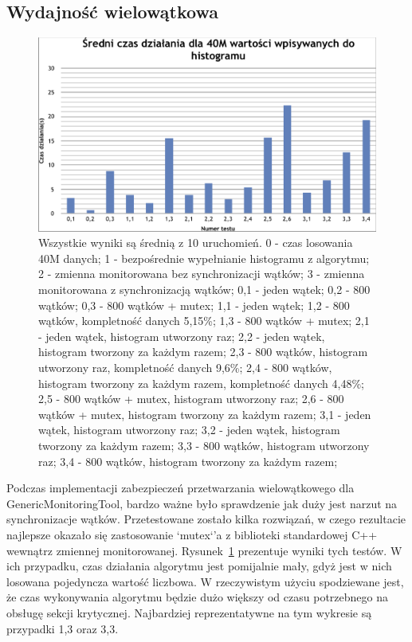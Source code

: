 \subsection{Wydajność wielowątkowa}

\begin{figure}[!ht]
\centering
\includegraphics[width=1\textwidth]{img/avg_run_time.png}
\caption{
Wszystkie wyniki są średnią z 10 uruchomień.
0 - czas losowania 40M danych; 
1 - bezpośrednie wypełnianie histogramu z algorytmu;
2 - zmienna monitorowana bez synchronizacji wątków;
3 - zmienna monitorowana z synchronizacją wątków;
0,1 - jeden wątek;
0,2 - 800 wątków;
0,3 - 800 wątków + mutex;
1,1 - jeden wątek;
1,2 - 800 wątków, kompletność danych 5,15\%;
1,3 - 800 wątków + mutex;
2,1 - jeden wątek, histogram utworzony raz;
2,2 - jeden wątek, histogram tworzony za każdym razem;
2,3 - 800 wątków, histogram utworzony raz, kompletność danych 9,6\%;
2,4 - 800 wątków, histogram tworzony za każdym razem, kompletność danych 4,48\%;
2,5 - 800 wątków + mutex, histogram utworzony raz;
2,6 - 800 wątków + mutex, histogram tworzony za każdym razem;
3,1 - jeden wątek, histogram utworzony raz;
3,2 - jeden wątek, histogram tworzony za każdym razem;
3,3 - 800 wątków, histogram utworzony raz;
3,4 - 800 wątków, histogram tworzony za każdym razem;
}
\label{fig:athena:avgRunTime}
\end{figure}

Podczas implementacji zabezpieczeń przetwarzania wielowątkowego dla GenericMonitoringTool, bardzo ważne było sprawdzenie jak duży jest narzut na synchronizacje wątków. 
Przetestowane zostało kilka rozwiązań, w czego rezultacie najlepsze okazało się zastosowanie `mutex`'a z biblioteki standardowej C++ wewnątrz zmiennej monitorowanej. 
Rysunek~\ref{fig:athena:avgRunTime} prezentuje wyniki tych testów. 
W ich przypadku, czas działania algorytmu jest pomijalnie mały, gdyż jest w nich losowana pojedyncza wartość liczbowa.
W rzeczywistym użyciu spodziewane jest, że czas wykonywania algorytmu będzie dużo większy od czasu potrzebnego na obsługę sekcji krytycznej. 
Najbardziej reprezentatywne na tym wykresie są przypadki 1,3 oraz 3,3.

